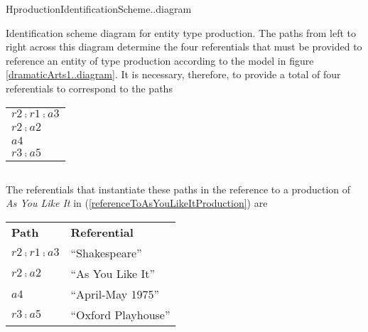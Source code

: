 \begin{erboxedFigure}{H}{productionIdentificationScheme..diagram}
{Identification scheme diagram for entity type production. 
The paths from left to right across this diagram determine the four referentials 
that must be provided to reference an entity of type production
according to the model in figure \ref{dramaticArts1..diagram}.
It is necessary, therefore,  to provide a total of four referentials
to correspond to the paths
\begin{center}
\begin{tabular}{p{3cm}}
$r2 \comp r1 \comp a3$ \\
$r2 \comp a2$ \\
$a4$          \\
$r3 \comp a5$ \\
\end{tabular}
\end{center}
}
 \begin{equation*}

\end{equation*}
\end{erboxedFigure}

The referentials that instantiate these paths in 
the reference to a production of 
\textit{As You Like It} in (\ref{referenceToAsYouLikeItProduction}) 
are\\
\newline
\begin{center}
\begin{tabular}{l l}
\textbf{Path}          & \textbf{Referential} \\
$r2 \comp r1 \comp a3$ & ``Shakespeare''       \\
$r2\comp a2$           & ``As You Like It''   \\
$a4$                   & ``April-May 1975''   \\
$r3 \comp a5$          & ``Oxford Playhouse''
\end{tabular}
\end{center}

